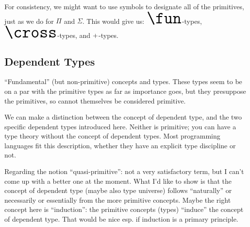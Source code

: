 \begin{ednote}
  For consistency, we might want to use symbols to designate all of
  the primitives, just as we do for \(\Pi\) and \(\Sigma\).  This
  would give us: \(\Huge\fun\)-types, \(\Huge\cross\)-types, and
  \(\Huge +\)-types.
\end{ednote}


\subsection{Dependent Types}
\label{subs:quasiprim}

\noindent ``Fundamental''%
(but non-primitive) concepts and types.  These types seem to be on a par
with the primitive types as far as importance goes, but they
presuppose the primitives, so cannot themselves be considered
primitive.

\begin{ednote}
  We can make a distinction between the concept of dependent type, and
  the two specific dependent types introduced here.  Neither is
  primitive; you can have a type theory without the concept of
  dependent types.  Most programming languages fit this description,
  whether they have an explicit type discipline or not.
\end{ednote}

\begin{ednote}
  Regarding the notion ``quasi-primitive'': not a very satisfactory
  term, but I can't come up with a better one at the moment.  What I'd
  like to show is that the concept of dependent type (maybe also type
  universe) follows ``naturally'' or necessarily or essentially from
  the more primitive concepts.  Maybe the right concept here is
  ``induction'': the primitive concepts (types) ``induce'' the concept
  of dependent type.  That would be nice esp. if induction is a
  primary principle.
\end{ednote}

